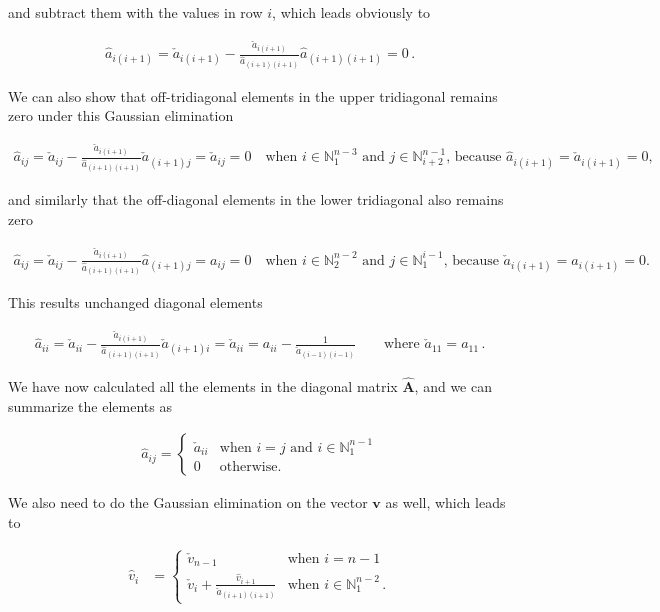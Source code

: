 \documentclass[11pt,english,a4paper]{article}
\begin{document}
\begin{flushleft}
and subtract them with the values in row $i$, which leads obviously to

\begin{align*}
\hat{a}_{i(i+1)} = \check{a}_{i(i+1)} - \frac{\check{a}_{i(i+1)}}{\hat{a}_{(i+1)(i+1)}}\hat{a}_{(i+1)(i+1)} = 0\,.
\end{align*}

We can also show that off-tridiagonal elements in the upper tridiagonal remains zero under this Gaussian elimination

\begin{align*}
\hat{a}_{ij} = \check{a}_{ij} - \frac{\check{a}_{i(i+1)}}{\hat{a}_{(i+1)(i+1)}} \check{a}_{(i+1)j} = \check{a}_{ij} = 0 \quad \text{when $i\in\mathbb{N}_1^{n-3}$ and $j\in\mathbb{N}_{i+2}^{n-1}$, because $\hat{a}_{i(i+1)}=\check{a}_{i(i+1)} = 0$,}
\end{align*}

and similarly that the off-diagonal elements in the lower tridiagonal also remains zero

\begin{align*}
\hat{a}_{ij} = \check{a}_{ij} - \frac{\check{a}_{i(i+1)}}{\hat{a}_{(i+1)(i+1)}} \hat{a}_{(i+1)j} = a_{ij} = 0 \quad \text{when $i\in\mathbb{N}_2^{n-2}$ and $j\in\mathbb{N}_{1}^{i-1}$, because $\check{a}_{i(i+1)}=a_{i(i+1)} = 0$.}
\end{align*}

This results unchanged diagonal elements

\begin{align*}
\hat{a}_{ii} = \check{a}_{ii} - \frac{\check{a}_{i(i+1)}}{\hat{a}_{(i+1)(i+1)}}\check{a}_{(i+1)i} = \check{a}_{ii} = a_{ii} - \frac{1}{\check{a}_{(i-1)(i-1)}} \qquad \text{where }\check{a}_{11} = a_{11}\,.
\end{align*}

We have now calculated all the elements in the diagonal matrix $\hat{\textbf{A}}$, and we can summarize the elements as

\begin{align*}
\hat{a}_{ij} = \begin{cases} \check{a}_{ii}  & \text{when } i=j \text{ and } i\in\mathbb{N}_{1}^{n-1} \\ 0 & \text{otherwise.} \end{cases}
\end{align*}

We also need to do the Gaussian elimination on the vector $\textbf{v}$ as well, which leads to

\begin{align*}
\hat{v}_i &= \begin{cases} \check{v}_{n-1} & \text{when $i=n-1$} \\ \check{v}_i + \frac{\hat{v}_{i+1}}{\check{a}_{(i+1)(i+1)}} & \text{when $i\in\mathbb{N}_1^{n-2}$}\,. \end{cases}
\end{align*}


\end{flushleft}
\end{document}
